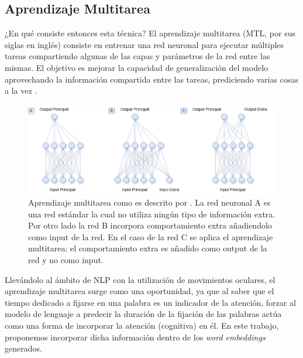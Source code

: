 \subsection{Aprendizaje Multitarea}

¿En qué consiste entonces esta técnica? El aprendizaje multitarea (MTL, por sus siglas en inglés) consiste en entrenar una red neuronal para ejecutar múltiples tareas compartiendo algunas de las capas y parámetros de la red entre las mismas. El objetivo es mejorar la capacidad de generalización del modelo aprovechando la información compartida entre las tareas, prediciendo varias cosas a la vez \parencite{Caruana1997}.

\begin{figure}[H]
    \centering
    \includegraphics[width=1\textwidth]{imagenes/multitarea.png}
    \caption{Aprendizaje multitarea como es descrito por \textcite{Caruana1997}. La red neuronal A es una red estándar la cual no utiliza ningún tipo de información extra. Por otro lado la red B incorpora comportamiento extra añadiendolo como input de la red. En el caso de la red C se aplica el aprendizaje multitarea: el comportamiento extra es añadido como output de la red y no como input.}
    \label{fig:multitarea}
\end{figure}

Llevándolo al ámbito de NLP con la utilización de movimientos oculares, el aprendizaje multitarea surge como una oportunidad, ya que al saber que el tiempo dedicado a fijarse en una palabra es un indicador de la atención, forzar al modelo de lenguaje a predecir la duración de la fijación de las palabras actúa como una forma de incorporar la atención (cognitiva) en él. En este trabajo, proponemos incorporar dicha información dentro de los \textit{word embeddings} generados.
